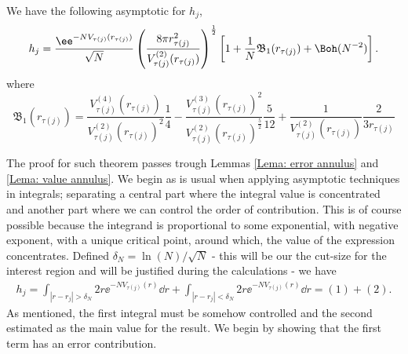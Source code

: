 \begin{teorema}
	We have the following asymptotic for $h_j$,
	\begin{equation}
		h_j = \frac{\ee^{-N V_{\tau(j)}(r_{\tau(j)})}}{\sqrt{N}} \left( \frac{8\pi r_{\tau(j)}^2}{V^{(2)}_{\tau(j)}(r_{\tau(j)})} \right)^{\frac{1}{2}} \left[ 1 + \frac{1}{N} \mathfrak{B}_1(r_{\tau(j)}) + \Boh(N^{-2}) \right].
		\label{Equation: Asymptotic hj annulus}
	\end{equation}
	where
	\begin{equation}
		\mathfrak{B}_1(r_{\tau(j)})  = \frac{V^{(4)}_{\tau(j)}(r_{\tau(j)})}{V^{(2)}_{\tau(j)}(r_{\tau(j)})^2} \frac{1}{4} - \frac{V^{(3)}_{\tau(j)}(r_{\tau(j)})^2}{V^{(2)}_{\tau(j)}(r_{\tau(j)})^{\frac{5}{2}}} \frac{5}{12} + \frac{1}{V^{(2)}_{\tau(j)}(r_{\tau(j)})} \frac{2}{3 r_{\tau(j)}}
	\end{equation}
	\label{Theorem: hj annulus}
\end{teorema}

The proof for such theorem passes trough Lemmas \ref{Lema: error annulus} and \ref{Lema: value annulus}. We begin as is usual when applying asymptotic techniques in integrals; separating a central part where the integral value is concentrated and another part where we can control the order of contribution. This is of course possible because the integrand is proportional to some exponential, with negative exponent, with a unique critical point, around which, the value of the expression concentrates. Defined $\delta_N = \ln(N)/\sqrt{N}$ - this will be our the cut-size for the interest region and will be justified during the calculations - we have
\begin{align}
	h_j =  \int_{|r - r_j| > \delta_N} 2r \ee^{-N V_{\tau(j)}(r)} \dd r + \int_{|r - r_j| < \delta_N} 2r \ee^{-N V_{\tau(j)}(r)} \dd r = (1) + (2).
\end{align}
As mentioned, the first integral must be somehow controlled and the second estimated as the main value for the result.  We begin by showing that the first term has an error contribution.

